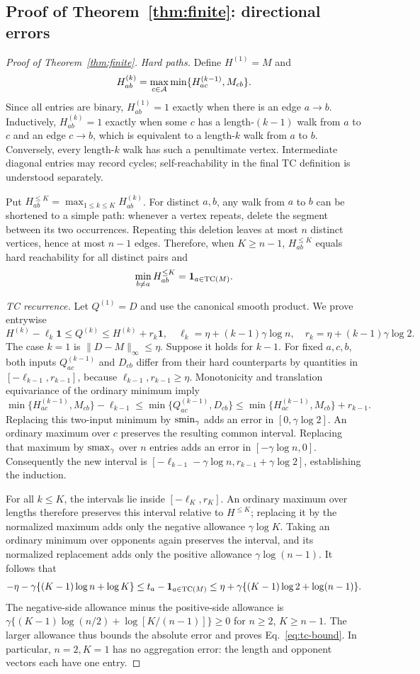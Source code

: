 \subsection{Proof of Theorem~\ref{thm:finite}: directional errors}
\begin{proof}[Proof of Theorem~\ref{thm:finite}]
\emph{Hard paths.} Define $H^{(1)}=M$ and
\[
H^{(k)}_{ab}=\max_{c\in\mathcal{A}}\min\{H^{(k-1)}_{ac},M_{cb}\}.
\]
Since all entries are binary, $H^{(1)}_{ab}=1$ exactly when there is an edge $a\to b$. Inductively, $H^{(k)}_{ab}=1$ exactly when some $c$ has a length-$(k-1)$ walk from $a$ to $c$ and an edge $c\to b$, which is equivalent to a length-$k$ walk from $a$ to $b$. Conversely, every length-$k$ walk has such a penultimate vertex. Intermediate diagonal entries may record cycles; self-reachability in the final TC definition is understood separately.

Put $H^{\le K}_{ab}=\max_{1\le k\le K}H^{(k)}_{ab}$. For distinct $a,b$, any walk from $a$ to $b$ can be shortened to a simple path: whenever a vertex repeats, delete the segment between its two occurrences. Repeating this deletion leaves at most $n$ distinct vertices, hence at most $n-1$ edges. Therefore, when $K\ge n-1$, $H^{\le K}_{ab}$ equals hard reachability for all distinct pairs and
\[
\min_{b\ne a}H^{\le K}_{ab}=\mathbf1_{a\in\mathrm{TC}(M)}.
\]

\emph{TC recurrence.} Let $Q^{(1)}=D$ and use the canonical smooth product. We prove entrywise
\[
H^{(k)}-\ell_k\mathbf1\le Q^{(k)}\le H^{(k)}+r_k\mathbf1,
\quad \ell_k=\eta+(k-1)\gamma\log n,
\quad r_k=\eta+(k-1)\gamma\log2.
\]
The case $k=1$ is $\|D-M\|_\infty\le\eta$. Suppose it holds for $k-1$. For fixed $a,c,b$, both inputs $Q^{(k-1)}_{ac}$ and $D_{cb}$ differ from their hard counterparts by quantities in $[-\ell_{k-1},r_{k-1}]$, because $\ell_{k-1},r_{k-1}\ge\eta$. Monotonicity and translation equivariance of the ordinary minimum imply
\[
\min\{H^{(k-1)}_{ac},M_{cb}\}-\ell_{k-1}
\le \min\{Q^{(k-1)}_{ac},D_{cb}\}
\le \min\{H^{(k-1)}_{ac},M_{cb}\}+r_{k-1}.
\]
Replacing this two-input minimum by $\operatorname{smin}_\gamma$ adds an error in $[0,\gamma\log2]$. An ordinary maximum over $c$ preserves the resulting common interval. Replacing that maximum by $\operatorname{smax}_\gamma$ over $n$ entries adds an error in $[-\gamma\log n,0]$. Consequently the new interval is $[-\ell_{k-1}-\gamma\log n,r_{k-1}+\gamma\log2]$, establishing the induction.

For all $k\le K$, the intervals lie inside $[-\ell_K,r_K]$. An ordinary maximum over lengths therefore preserves this interval relative to $H^{\le K}$; replacing it by the normalized maximum adds only the negative allowance $\gamma\log K$. Taking an ordinary minimum over opponents again preserves the interval, and its normalized replacement adds only the positive allowance $\gamma\log(n-1)$. It follows that
\[
-\eta-\gamma\{(K-1)\log n+\log K\}
\le t_a-\mathbf1_{a\in\mathrm{TC}(M)}
\le \eta+\gamma\{(K-1)\log2+\log(n-1)\}.
\]
The negative-side allowance minus the positive-side allowance is
$\gamma\{(K-1)\log(n/2)+\log[K/(n-1)]\}\ge0$ for $n\ge2$, $K\ge n-1$. The larger allowance thus bounds the absolute error and proves Eq.~\eqref{eq:tc-bound}. In particular, $n=2,K=1$ has no aggregation error: the length and opponent vectors each have one entry.


\end{proof}
